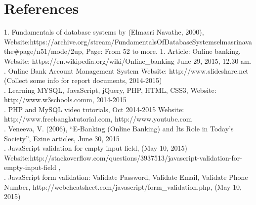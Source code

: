 \documentclass{article}
\begin{document}
\section{References}
1.  Fundamentals of database systems by (Elmasri Navathe, 2000), Website:https://archive.org/stream/FundamentalsOfDatabaseSystemselmasrinavathe#page/n51/mode/2up, Page: From 52 to more. 1.  Article: Online banking, Website: https://en.wikipedia.org/wiki/Online_banking June 29, 2015, 12.30 am.\\ \hfill {}.  Online Bank Account Management System Website: http://www.slideshare.net (Collect some info for report documents, 2014-2015)\\ \hfill {}.  Learning MYSQL, JavaScript, jQuery, PHP, HTML, CSS3,   Website: http://www.w3schools.comm, 2014-2015\\ \hfill {}.  PHP and MySQL video tutorials, Oct 2014-2015 Website: http://www.freebanglatutorial.com, http://www.youtube.com\\ \hfill {}.  Veneeva, V. (2006), “E-Banking (Online Banking) and Its Role in Today's Society”, Ezine articles, June 30, 2015\\ \hfill {}.  JavaScript validation for empty input field, (May 10, 2015) Website:http://stackoverflow.com/questions/3937513/javascript-validation-for-empty-input-field , \\ \hfill {}.  JavaScript form validation: Validate Password, Validate Email, Validate Phone Number, http://webcheatsheet.com/javascript/form_validation.php, (May 10, 2015)
\end{document}
